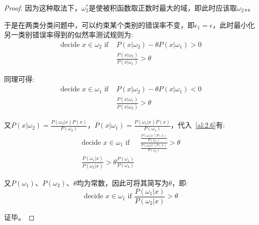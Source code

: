 \documentclass[UTF8]{article} %
\begin{document}
\begin{proof}
        因为这种取法下，$\omega_2^{*}$是使被积函数取正数时最大的域，即此时应该取$\omega_2$，。

        于是在两类分类问题中，可以约束某个类别的错误率不变，即$\epsilon_1 = \epsilon$，此时最小化另一类别错误率得到的似然率测试规则为:
        \begin{align}
            \text{decide } x \in \omega_2 \text{ if } & P(x|\omega_2) - \theta P(x|\omega_1) > 0 \\
            & \frac{P(x|\omega_2)}{P(x|\omega_1)} > \theta
        \end{align}

        同理可得:
        \begin{align}
            \text{decide } x \in \omega_1 \text{ if } & P(x|\omega_2) - \theta P(x|\omega_1) < 0 \\
            & \frac{P(x|\omega_1)}{P(x|\omega_2)} > \theta \label{al:2.6}
        \end{align}

        又$P(x|\omega_2) = \frac{P(\omega_2|x) P(x)}{P(\omega_2)}$，$P(x|\omega_1) = \frac{P(\omega_1|x) P(x)}{P(\omega_1)}$，代入~\eqref{al:2.6}有:
        \begin{align}
            \text{decide } x \in \omega_1 \text{ if } & \frac{\frac{P(\omega_1|x) P(x)}{P(\omega_1)}}{\frac{P(\omega_2|x) P(x)}{P(\omega_2)}} > \theta \\
            \frac{P(\omega_1|x)}{P(\omega_2|x)} > \theta \frac{P(\omega_1)}{P(\omega_2)} \label{al:2.7}
        \end{align}

        又$P(\omega_1)$、$P(\omega_2)$、$\theta$均为常数，因此可将其简写为$\theta$，即:
        \[
        \text{decide } x \in \omega_1 \text{ if } \frac{P(\omega_1|x)}{P(\omega_2|x)} > \theta
        \]

        证毕。

    \end{proof}
\end{document}
